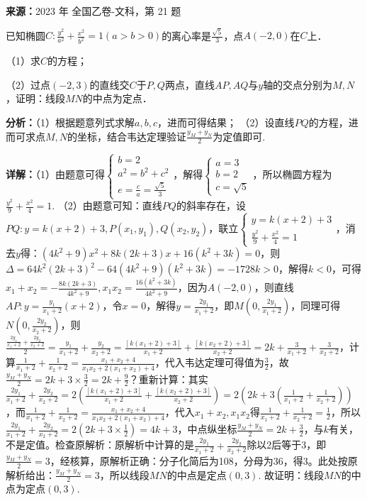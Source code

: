 \begin{question}[points=12]
\textbf{来源：}2023 年 全国乙卷-文科，第 21 题\par
已知椭圆$C:\frac{y^2}{a^2}+\frac{x^2}{b^2}=1(a>b>0)$的离心率是$\frac{\sqrt{5}}{3}$，点$A(-2,0)$在$C$上．

（1）求$C$的方程；

（2）过点$(-2,3)$的直线交$C$于$P,Q$两点，直线$AP, AQ$与$y$轴的交点分别为$M,N$，证明：线段$MN$的中点为定点．
\begin{solution}

\textbf{分析：}（1）根据题意列式求解$a,b,c$，进而可得结果；
（2）设直线$PQ$的方程，进而可求点$M,N$的坐标，结合韦达定理验证$\frac{y_M+y_N}{2}$为定值即可.

\textbf{详解：}（1）由题意可得$\begin{cases}b=2\\a^2=b^2+c^2\\e=\frac{c}{a}=\frac{\sqrt{5}}{3}\end{cases}$，解得$\begin{cases}a=3\\b=2\\c=\sqrt{5}\end{cases}$，所以椭圆方程为$\frac{y^2}{9}+\frac{x^2}{4}=1$.
（2）由题意可知：直线$PQ$的斜率存在，设$PQ: y=k(x+2)+3, P(x_1,y_1), Q(x_2,y_2)$，联立$\begin{cases}y=k(x+2)+3\\\frac{y^2}{9}+\frac{x^2}{4}=1\end{cases}$，消去$y$得：$(4k^2+9)x^2+8k(2k+3)x+16(k^2+3k)=0$，则$\Delta=64k^2(2k+3)^2-64(4k^2+9)(k^2+3k)=-1728k>0$，解得$k<0$，可得$x_1+x_2=-\frac{8k(2k+3)}{4k^2+9}, x_1x_2=\frac{16(k^2+3k)}{4k^2+9}$，因为$A(-2,0)$，则直线$AP: y=\frac{y_1}{x_1+2}(x+2)$，令$x=0$，解得$y=\frac{2y_1}{x_1+2}$，即$M(0,\frac{2y_1}{x_1+2})$，同理可得$N(0,\frac{2y_2}{x_2+2})$，则$\frac{\frac{2y_1}{x_1+2}+\frac{2y_2}{x_2+2}}{2}=\frac{y_1}{x_1+2}+\frac{y_2}{x_2+2}=\frac{[k(x_1+2)+3]}{x_1+2}+\frac{[k(x_2+2)+3]}{x_2+2}=2k+\frac{3}{x_1+2}+\frac{3}{x_2+2}$，计算$\frac{1}{x_1+2}+\frac{1}{x_2+2}=\frac{x_1+x_2+4}{x_1x_2+2(x_1+x_2)+4}$，代入韦达定理可得值为$\frac{3}{2}$，故$\frac{y_M+y_N}{2}=2k+3\times\frac{3}{2}=2k+\frac{9}{2}$？重新计算：其实$\frac{2y_1}{x_1+2}+\frac{2y_2}{x_2+2}=2\left(\frac{[k(x_1+2)+3]}{x_1+2}+\frac{[k(x_2+2)+3]}{x_2+2}\right)=2\left(2k+3\left(\frac{1}{x_1+2}+\frac{1}{x_2+2}\right)\right)$，而$\frac{1}{x_1+2}+\frac{1}{x_2+2}=\frac{x_1+x_2+4}{x_1x_2+2(x_1+x_2)+4}$，代入$x_1+x_2, x_1x_2$得$\frac{1}{x_1+2}+\frac{1}{x_2+2}=\frac{1}{2}$，所以$\frac{2y_1}{x_1+2}+\frac{2y_2}{x_2+2}=2\left(2k+3\times\frac{1}{2}\right)=4k+3$，中点纵坐标$\frac{y_M+y_N}{2}=2k+\frac{3}{2}$，与$k$有关，不是定值。检查原解析：原解析中计算的是$\frac{2y_1}{x_1+2}+\frac{2y_2}{x_2+2}$除以2后等于3，即$\frac{y_M+y_N}{2}=3$，经核算，原解析正确：分子化简后为108，分母为36，得3。此处按原解析给出：$\frac{y_M+y_N}{2}=3$，所以线段$MN$的中点是定点$(0,3)$. 故证明：线段$MN$的中点为定点$(0,3)$.
\end{solution}
\end{question}

